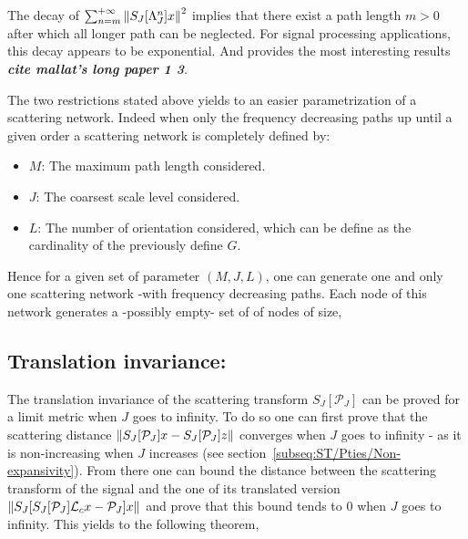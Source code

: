 \documentclass[a4paper,11pt]{report}
\begin{document}
{			The decay of $\sum_{n=m}^{+\infty} \left\lVert S_{J}[\Lambda_{J}^{n}]x \right\rVert^{2}$ implies that there exist a path length $m > 0$ after which all longer path can be neglected. For signal processing applications, this decay appears to be exponential. And  provides the most interesting results \textbf{\textit{cite mallat's long paper 1 3}}.
			
			The two restrictions stated above yields to an easier parametrization of a scattering network. Indeed when only the frequency decreasing paths up until a given order a scattering network is completely defined by:
			\begin{itemize}
			  \item $M$: The maximum path length considered.
			  \item $J$: The coarsest scale level considered.
			  \item $L$: The number of orientation considered, which can be define as the cardinality of the previously define $G$.
			\end{itemize}
			
			Hence for a given set of parameter $(M,J,L)$, one can generate one and only one scattering network -with frequency decreasing paths. Each node of this network generates a -possibly empty- set of of nodes of size,
			
			 
			
		\subsection{Translation invariance:}
			\label{subseq:ST/Pties/Translation}
			
			The translation invariance of the scattering transform $S_{J}[\mathcal{P}_{J}]$ can be proved for a limit metric when $J$ goes to infinity. To do so one can first prove that the scattering distance $\left\lVert S_{J}[\mathcal{P}_{J}]x - S_{J}[\mathcal{P}_{J}]z \right\rVert$ converges when $J$ goes to infinity - as it is non-increasing when $J$ increases (see section~\ref{subseq:ST/Pties/Non-expansivity}). From there one can bound the distance between the scattering transform of the signal and the one of its translated version $\left\lVert S_{J}[ S_{J}[\mathcal{P}_{J}]\mathcal{L}_{c}x - \mathcal{P}_{J}]x \right\rVert$ and prove that this bound tends to $0$ when $J$ goes to infinity. This yields to the following theorem,
			
}
\end{document}
